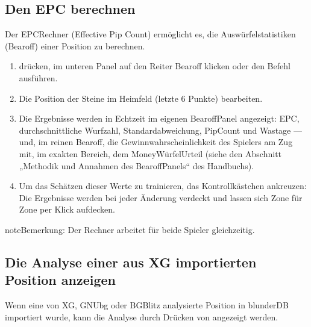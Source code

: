 \documentclass[letterpaper,10pt,german]{sphinxmanual}
\begin{document}
\subsection{Den EPC berechnen}
\label{\detokenize{guide_utilisateur:calculer-l-epc}}
\sphinxAtStartPar
Der EPC\sphinxhyphen{}Rechner (Effective Pip Count) ermöglicht es, die Auswürfelstatistiken (Bearoff) einer Position zu berechnen.
\begin{enumerate}
%
\item {} 
\sphinxAtStartPar
{} drücken, im unteren Panel auf den Reiter Bearoff klicken oder den Befehl  ausführen.

\item {} 
\sphinxAtStartPar
Die Position der Steine im Heimfeld (letzte 6 Punkte) bearbeiten.

\item {} 
\sphinxAtStartPar
Die Ergebnisse werden in Echtzeit im eigenen Bearoff\sphinxhyphen{}Panel angezeigt: EPC, durchschnittliche Wurfzahl, Standardabweichung, Pip\sphinxhyphen{}Count und Wastage — und, im reinen Bearoff, die Gewinnwahrscheinlichkeit des Spielers am Zug mit, im exakten Bereich, dem Money\sphinxhyphen{}Würfel\sphinxhyphen{}Urteil (siehe den Abschnitt „Methodik und Annahmen des Bearoff\sphinxhyphen{}Panels“ des Handbuchs).

\item {} 
\sphinxAtStartPar
Um das Schätzen dieser Werte zu trainieren, das Kontrollkästchen  ankreuzen: Die Ergebnisse werden bei jeder Änderung verdeckt und lassen sich Zone für Zone per Klick aufdecken.

\end{enumerate}

\begin{sphinxadmonition}{note}{Bemerkung:}
\sphinxAtStartPar
Der Rechner arbeitet für beide Spieler gleichzeitig.
\end{sphinxadmonition}


\subsection{Die Analyse einer aus XG importierten Position anzeigen}
\label{\detokenize{guide_utilisateur:afficher-l-analyse-d-une-position-importee-depuis-xg}}
\sphinxAtStartPar
Wenn eine von XG, GNUbg oder BGBlitz analysierte Position in blunderDB importiert wurde, kann die Analyse durch Drücken von  angezeigt werden.
\end{document}
